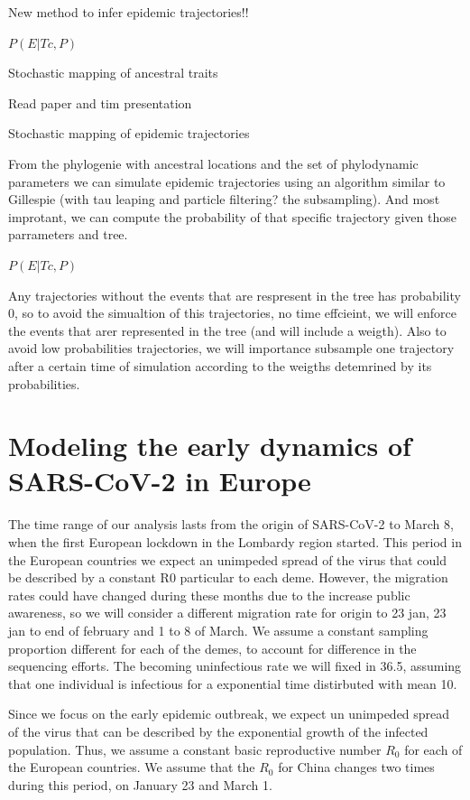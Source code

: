 New method to infer epidemic trajectories!!

$P(E | Tc, P)$

Stochastic mapping of ancestral traits

Read paper and tim presentation

Stochastic mapping of epidemic trajectories

From the phylogenie with ancestral locations and the set of phylodynamic parameters we can simulate epidemic trajectories using an algorithm similar to Gillespie (with tau leaping and particle filtering? the subsampling). And most improtant, we can compute the probability of that specific trajectory given those parrameters and tree. 

$P(E|Tc, P)$

Any trajectories without the events that are respresent in the tree has probability 0, so to avoid the simualtion of this trajectories, no time effcieint, we will enforce the events that arer represented in the tree (and will include a weigth). Also to avoid low probabilities trajectories, we will importance subsample one trajectory after a certain time of simulation according to the weigths detemrined by its probabilities. 


\section{Modeling the early dynamics of SARS-CoV-2 in Europe}

The time range of our analysis lasts from the origin of SARS-CoV-2 to March 8, when the first European lockdown in the Lombardy region started. This period in the European countries we expect an unimpeded spread of the virus that could be described by a constant R0 particular to each deme. However, the migration rates could have changed during these months due to the increase public awareness, so we will consider a different migration rate for origin to 23 jan, 23 jan to end of february and 1 to 8 of March. We assume a constant sampling proportion different for each of the demes, to account for difference in the sequencing efforts. The becoming uninfectious rate we will fixed in 36.5, assuming that one individual is infectious for a exponential time distirbuted with mean 10.

Since we focus on the early epidemic outbreak, we expect un unimpeded spread of the virus that can be described by the exponential growth of the infected population. Thus, we assume a constant basic reproductive number $R_0$ for each of the European countries. We assume that the $R_0$ for China changes two times during this period, on January 23 and March 1.

